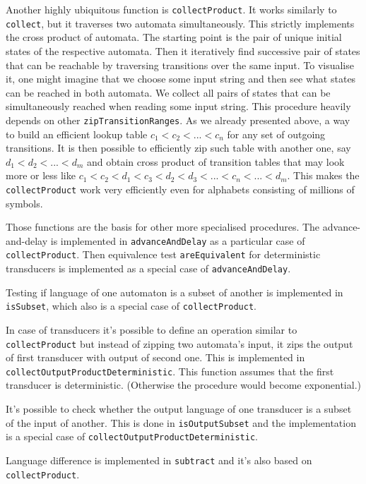 \documentclass[12pt]{article}
\begin{document}
Another highly ubiquitous function is \texttt{collectProduct}. It works similarly to \texttt{collect}, but it traverses two automata simultaneously.  This strictly implements the cross product of automata. The starting point is the pair of unique initial states of the respective automata. Then it iteratively find successive  pair of states that can be reachable by traversing transitions over the same input. To visualise it, one might imagine that we choose some input string and then see what states can be reached in both automata. We collect all pairs of states that can be simultaneously reached when reading some input string.
This procedure heavily depends on other \texttt{zipTransitionRanges}. As we already presented above, a way to build an efficient lookup table $c_1<c_2<...<c_n$ for any set of outgoing transitions. It is
then possible to efficiently zip such table with another one, say $d_1<d_2<...<d_m$  and obtain cross product of transition tables that may look more or less like
$c_1<c_2<d_1<c_3<d_2<d_3<...<c_n<...<d_m$. This makes the \texttt{collectProduct} work very efficiently even for alphabets consisting of millions of symbols.

Those functions are the basis for other more specialised procedures. The advance-and-delay \cite{Marie-Pierre} is implemented in \texttt{advanceAndDelay} as a particular case of \texttt{collectProduct}. Then equivalence test \texttt{areEquivalent} for deterministic transducers is implemented as a special case of  \texttt{advanceAndDelay}. 

Testing if language of one automaton is a subset of another is implemented in \texttt{isSubset}, which also is a special case of 
\texttt{collectProduct}.

In case of transducers it's possible to define an operation similar to \texttt{collectProduct} but instead of zipping two automata's input, it zips the output of first transducer with output of second one. This is implemented in \texttt{collectOutputProductDeterministic}. This function assumes that the first transducer is deterministic. (Otherwise the procedure would become exponential.) 

It's possible to check whether the output language of one transducer is a subset of the input of another. This is done in \texttt{isOutputSubset} and the implementation is a special case of \texttt{collectOutputProductDeterministic}. 

Language difference is implemented in \texttt{subtract} and it's also based on \texttt{collectProduct}.
\end{document}
